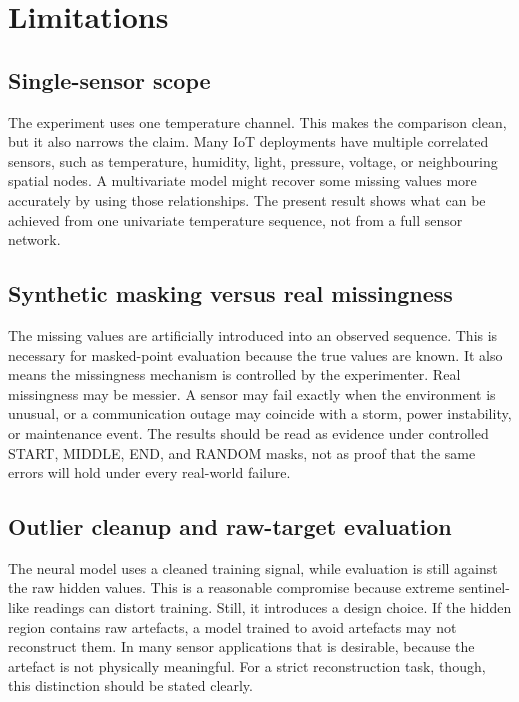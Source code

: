 \section{Limitations}
\label{sec:results-limitations}

\subsection{Single-sensor scope}

The experiment uses one temperature channel. This makes the comparison clean, but it also narrows the claim. Many IoT deployments have multiple correlated sensors, such as temperature, humidity, light, pressure, voltage, or neighbouring spatial nodes. A multivariate model might recover some missing values more accurately by using those relationships. The present result shows what can be achieved from one univariate temperature sequence, not from a full sensor network.

\subsection{Synthetic masking versus real missingness}

The missing values are artificially introduced into an observed sequence. This is necessary for masked-point evaluation because the true values are known. It also means the missingness mechanism is controlled by the experimenter. Real missingness may be messier. A sensor may fail exactly when the environment is unusual, or a communication outage may coincide with a storm, power instability, or maintenance event. The results should be read as evidence under controlled START, MIDDLE, END, and RANDOM masks, not as proof that the same errors will hold under every real-world failure.

\subsection{Outlier cleanup and raw-target evaluation}

The neural model uses a cleaned training signal, while evaluation is still against the raw hidden values. This is a reasonable compromise because extreme sentinel-like readings can distort training. Still, it introduces a design choice. If the hidden region contains raw artefacts, a model trained to avoid artefacts may not reconstruct them. In many sensor applications that is desirable, because the artefact is not physically meaningful. For a strict reconstruction task, though, this distinction should be stated clearly.


